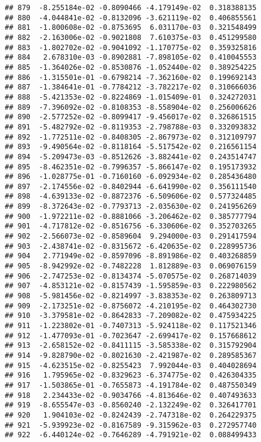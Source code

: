 \documentclass[
]{article}
\begin{document}
\begin{verbatim}
## 879  -8.255184e-02 -0.8090466 -4.179149e-02  0.318388135
## 880  -4.044841e-02 -0.8132096 -3.621119e-02  0.406855561
## 881  -1.800608e-02 -0.8753695  6.031170e-03  0.321548499
## 882  -2.163006e-02 -0.9021808  7.610375e-03  0.451299580
## 883  -1.802702e-02 -0.9041092 -1.170775e-02  0.359325816
## 884   2.678310e-03 -0.8902881 -7.898105e-02  0.410045553
## 885  -1.364026e-02 -0.8530876 -1.052440e-02  0.389254225
## 886  -1.315501e-01 -0.6798214 -7.362160e-02  0.199692143
## 887  -1.384641e-01 -0.7784212 -3.782217e-02  0.310666036
## 888  -5.421353e-02 -0.8224869 -1.015409e-01  0.324272031
## 889  -7.396092e-02 -0.8108353 -8.558904e-02  0.256006626
## 890  -2.577252e-02 -0.8099417 -9.456017e-02  0.326861515
## 891  -5.482792e-02 -0.8119353 -2.798788e-03  0.332093832
## 892  -1.772511e-02 -0.8408305 -2.867973e-02  0.312109797
## 893  -9.490564e-02 -0.8118164 -5.517542e-02  0.216561154
## 894  -5.209473e-03 -0.8512626 -3.882441e-02  0.243514747
## 895  -8.462351e-02 -0.7996357 -5.866147e-02  0.195173932
## 896  -1.028775e-01 -0.7160160 -6.092934e-02  0.285436480
## 897  -2.174556e-02 -0.8402944 -6.641990e-02  0.356111540
## 898  -4.639133e-02 -0.8872376 -6.509606e-02  0.577324485
## 899  -8.372643e-02 -0.7793713 -2.035630e-02  0.241956269
## 900  -1.972211e-02 -0.8881066 -3.206462e-02  0.385777794
## 901  -4.717812e-02 -0.8516756 -6.330606e-02  0.352703265
## 902  -2.566073e-02 -0.8589604  9.294000e-03  0.291417594
## 903  -2.438741e-02 -0.8315672 -6.420635e-02  0.228995736
## 904   2.771949e-02 -0.8597096 -8.891986e-02  0.403268859
## 905  -8.942992e-02 -0.7482228  1.812889e-03  0.069076159
## 906  -2.747253e-02 -0.8134374 -5.070575e-02  0.268714039
## 907  -4.853121e-02 -0.8157439 -1.595859e-03  0.222980562
## 908  -5.981456e-02 -0.8214997 -3.838353e-02  0.263809713
## 909  -2.173251e-02 -0.8756072 -4.210195e-02  0.464302730
## 910  -3.379581e-02 -0.8642833 -7.209082e-02  0.475934225
## 911  -1.223802e-01 -0.7407313 -5.924118e-02  0.117521346
## 912  -1.477093e-01 -0.7023647 -2.699417e-02  0.157668612
## 913  -2.658152e-02 -0.8411115 -3.585338e-02  0.315792904
## 914  -9.828790e-02 -0.8021630 -2.421987e-02  0.289585367
## 915  -4.623515e-02 -0.8255423  7.992044e-03  0.404028694
## 916   1.795965e-02 -0.8329623 -6.374775e-02  0.426304335
## 917  -1.503865e-01 -0.7655873 -4.191784e-02  0.487550349
## 918   2.234433e-02 -0.9034766 -4.813646e-02  0.407493633
## 919  -8.655547e-03 -0.8560240 -2.132249e-02  0.326417701
## 920   1.904103e-02 -0.8242439 -2.747318e-02  0.264229375
## 921  -5.939923e-02 -0.8167589 -9.315962e-03  0.272957740
## 922  -6.440124e-02 -0.7646289 -4.791921e-02  0.088499433

\end{verbatim}
\end{document}
